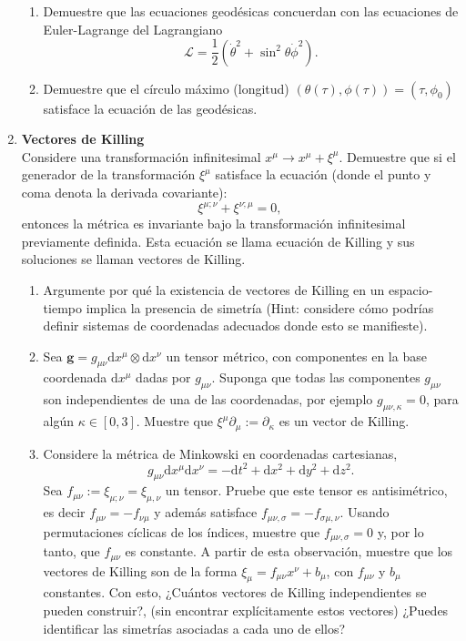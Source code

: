 \documentclass[../main]{subfiles}
\begin{document}
\begin{adjustwidth}{0pt}{-100pt}
\begin{enumerate}
\begin{enumerate}[label=(\alph*)]
        \item Demuestre que las ecuaciones geodésicas concuerdan con las ecuaciones de Euler-Lagrange del Lagrangiano 
        \begin{equation}
            \mathcal{L}=\dfrac{1}{2}(\dot{\theta}^2+\sin^2 \theta \dot{\phi}^2).
        \end{equation}
        \item Demuestre que el círculo máximo (longitud) $(\theta(\tau), \phi(\tau))=(\tau, \phi_0)$ satisface la ecuación de las geodésicas.
    \end{enumerate}
    \item \textbf{Vectores de Killing}\\
    Considere una transformación infinitesimal $x^{\mu}\rightarrow x^{\mu}+\xi^{\mu}$. Demuestre que si el generador de la transformación $\xi^{\mu}$ satisface la ecuación (donde el punto y coma denota la derivada covariante):
    \begin{equation}
        \xi^{\mu; \nu}+\xi^{\nu; \mu}=0,
    \end{equation}
    entonces la métrica es invariante bajo la transformación infinitesimal previamente definida. Esta ecuación se llama ecuación de Killing y sus soluciones se llaman vectores de Killing. 
    \begin{enumerate}[label=(\alph*)]
        \item Argumente por qué la existencia de vectores de Killing en un espacio-tiempo implica la presencia de simetría (Hint: considere cómo podrías definir sistemas de coordenadas adecuados donde esto se manifieste).
        \item Sea $\boldsymbol{g}=g_{\mu\nu}\mathrm{d}x^{\mu}\otimes \mathrm{d}x^{\nu}$ un tensor métrico, con componentes en la base coordenada $\mathrm{d}x^{\mu}$ dadas por $g_{\mu\nu}$. Suponga que todas las componentes $g_{\mu\nu}$ son independientes de una de las coordenadas, por ejemplo $g_{\mu\nu, \kappa}=0$, para algún $\kappa \in [0, 3]$. Muestre que $\xi^{\mu} \partial_{\mu}:= \partial_{\kappa}$ es un vector de Killing.
        \item Considere la métrica de Minkowski en coordenadas cartesianas,
        \begin{equation}
            g_{\mu\nu}\mathrm{d}x^{\mu}\mathrm{d}x^{\nu}=-\mathrm{d}t^2+\mathrm{d}x^2+\mathrm{d}y^2+\mathrm{d}z^2.
        \end{equation}
        Sea $f_{\mu\nu}:=\xi_{\mu;\nu}=\xi_{\mu, \nu}$ un tensor. Pruebe que este tensor es antisimétrico, es decir $f_{\mu\nu}=-f_{\nu\mu}$ y además satisface $f_{\mu\nu, \sigma}=-f_{\sigma\mu, \nu}$. Usando permutaciones cíclicas de los índices, muestre que $f_{\mu\nu, \sigma}=0$ y, por lo tanto, que $f_{\mu\nu}$ es constante. A partir de esta observación, muestre que los vectores de Killing son de la forma $\xi_{\mu}=f_{\mu\nu}x^{\nu}+b_{\mu}$, con $f_{\mu\nu}$ y $b_{\mu}$ constantes. Con esto, ¿Cuántos vectores de Killing independientes se pueden construir?, (sin encontrar explícitamente estos vectores) ¿Puedes identificar las simetrías asociadas a cada uno de ellos?

\end{enumerate}
\end{enumerate}
\end{adjustwidth}
\end{document}
